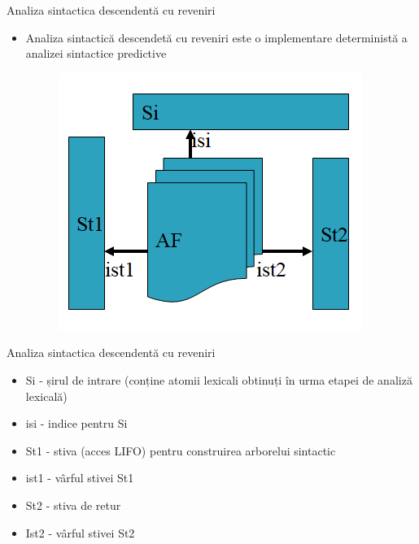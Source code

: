 \documentclass[pdf]{beamer}
\begin{document}
\begin{frame}{Analiza sintactica descendentă cu reveniri}
\begin{itemize}
\item 
Analiza sintactică descendetă cu reveniri este o implementare deterministă a analizei sintactice predictive

\begin{figure}
\centering
\includegraphics[scale=0.8]{img/asdr}
\end{figure}
\end{itemize}
\end{frame}



\begin{frame}{Analiza sintactica descendentă cu reveniri}
\begin{itemize}
\item 
Si - șirul de intrare (conține atomii lexicali obtinuți în urma etapei de analiză lexicală)

\item 
isi - indice pentru Si

\item 
St1 - stiva (acces LIFO) pentru construirea arborelui sintactic

\item 
ist1 - vârful stivei St1

\item 
St2 - stiva de retur

\item 
Ist2 - vârful stivei St2
\end{itemize}
\end{frame}
\end{document}
